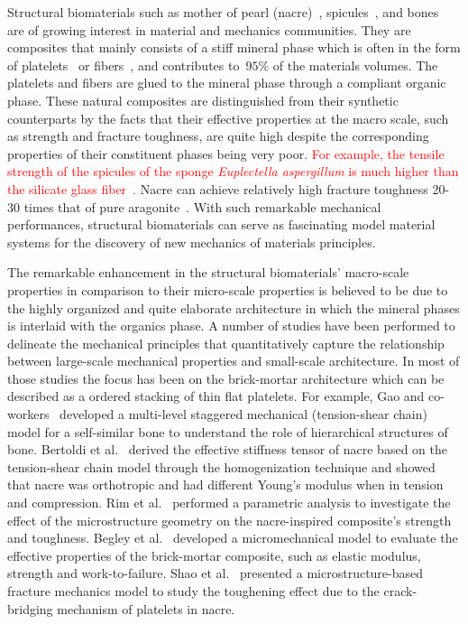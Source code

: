 \documentclass[preprint,10pt,times]{elsarticle}
\numberwithin{equation}{section}
\renewcommand{\>}{$\Rightarrow$}
\begin{document}
Structural biomaterials such as mother of pearl (nacre)~\cite{jackson1988mechanical}, spicules~\cite{monn2015new}, and bones~\cite{wegst2015bioinspired} are of growing interest in material and mechanics communities.
%
They are composites that mainly consists of a stiff mineral phase which is often in the form of platelets~\cite{currey1977mechanical, meyers2008biological, espinosa2011tablet} or fibers~\cite{Aizenberg2005, zhang2011structure, li2015hierarchical}, and contributes to~$95\%$ of the materials volumes.
%
The platelets and fibers are glued to the mineral phase through a compliant organic phase.
%
These natural composites are distinguished from their synthetic counterparts by the facts that their effective properties at the macro scale, such as strength and fracture toughness, are quite high despite the corresponding properties of their constituent phases being very poor.
%
\textcolor{red}{For example, the tensile strength of the spicules of the sponge \textit{Euplectella aspergillum} is much higher than the silicate glass fiber~\cite{walter2007mechanisms}.}\marginpar{}
%
Nacre can achieve relatively high fracture toughness 20-30 times that of pure aragonite~\cite{tang2007elasto, barthelat2007experimental}.
%
With such remarkable mechanical performances, structural biomaterials can serve as fascinating model material systems for the discovery of new mechanics of materials principles.
%


The remarkable enhancement in the structural biomaterials' macro-scale properties in comparison to their micro-scale properties is believed to be due to the highly organized and quite elaborate architecture in which the mineral phases is interlaid with the organics phase.
A number of studies have been performed to delineate the mechanical principles that quantitatively capture the relationship between large-scale mechanical properties and small-scale architecture.
%
In most of those studies the focus has been on the brick-mortar architecture which can be described as a ordered stacking of thin flat platelets.
%
For example, Gao and co-workers~\cite{gao2006application, ji2010mechanical} developed a multi-level staggered mechanical (tension-shear chain) model for a self-similar bone to understand the role of hierarchical structures of bone.
%
Bertoldi et al.~\cite{bertoldi2008nacre} derived the effective stiffness tensor of nacre based on the tension-shear chain model through the homogenization technique and showed that nacre was orthotropic and had different Young's modulus when in tension and compression.
%
Rim et al.~\cite{rim2011dimensional} performed a parametric analysis to investigate the effect of the microstructure geometry on the nacre-inspired composite's strength and toughness.
%
Begley et al.~\cite{begley2012micromechanical} developed a micromechanical model to evaluate the effective properties of the brick-mortar composite, such as elastic modulus, strength and work-to-failure.
%
Shao et al.~\cite{shao2012discontinuous} presented a microstructure-based fracture mechanics model to study the toughening effect due to the crack-bridging mechanism of platelets in nacre.
%
\end{document}
